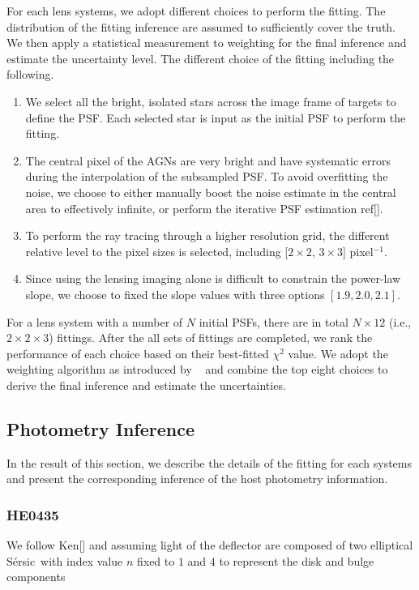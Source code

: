 \documentclass[fleqn,usenatbib]{mnras}
\newcommand{\sersic}{S\'ersic}
\begin{document}
For each lens systems, we adopt different choices to perform the fitting. The distribution of the fitting inference are assumed to sufficiently cover the truth. We then apply a statistical measurement to weighting for the final inference and estimate the uncertainty level. The different choice of the fitting including the following.
\begin{enumerate}
\item  We select all the bright, isolated stars across the image frame of targets to define the PSF. Each selected star is input as the initial PSF to perform the fitting.
\item The central pixel of the AGNs are very bright and have systematic errors during the interpolation of the subsampled PSF. To avoid overfitting the noise, we choose to either manually boost the noise estimate in the central area to effectively infinite, or perform the iterative PSF estimation ref[].
\item To perform the ray tracing through a higher resolution grid, the different relative level to the pixel sizes is selected, including [$2\times2$, $3\times3$] pixel$^{-1}$.
\item Since using the lensing imaging alone is difficult to constrain the power-law slope, we choose to fixed the slope values with three options $[1.9, 2.0, 2.1]$.
\end{enumerate}

For a lens system with a number of $N$ initial PSFs, there are in total $N\times12$ (i.e., $2 \times2 \times3$) fittings. After the all sets of fittings are completed, we rank the performance of each choice based on their best-fitted $\chi^2$ value. We adopt the weighting algorithm as introduced by ~\citet{Ding2020} and combine the top eight choices to derive the final inference and estimate the uncertainties.

\subsection{Photometry Inference}
In the result of this section, we describe the details of the fitting for each systems and present the corresponding inference of the host photometry information. 

\subsubsection{HE0435}
We follow Ken[] and assuming light of the deflector are composed of two elliptical \sersic\ with index value $n$ fixed to $1$ and $4$ to represent the disk and bulge components
\end{document}
